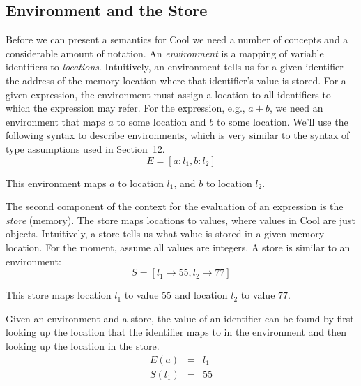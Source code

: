 \documentclass[]{article}
\begin{document}
\subsection{Environment and the Store}

Before we can present a semantics for Cool we need a number of concepts
and a considerable amount of notation. An \emph{environment} is a
mapping of variable identifiers to \emph{locations}. Intuitively, an
environment tells us for a given identifier the address of the memory
location where that identifier's value is stored. For a given
expression, the environment must assign a location to all identifiers to
which the expression may refer. For the expression, e.g., $a + b$, we
need an environment that maps $a$ to some location and $b$ to some
location. We'll use the following syntax to describe environments, which
is very similar to the syntax of type assumptions used in
Section~\href{node41.html\#sec-typrules}{12}. \\

\begin{displaymath}
E = [ a:l_1, b:l_2]
\end{displaymath}

This environment maps $a$ to location $l_1$, and $b$ to location $l_2$.

The second component of the context for the evaluation of an expression
is the \emph{store} (memory). The store maps locations to values, where
values in Cool are just objects. Intuitively, a store tells us what
value is stored in a given memory location. For the moment, assume all
values are integers. A store is similar to an environment: \\

\begin{displaymath}
S = [ l_1\rightarrow 55, l_2\rightarrow 77 ]
\end{displaymath}

This store maps location $l_1$ to value $55$ and location $l_2$ to value
$77$.

Given an environment and a store, the value of an identifier can be
found by first looking up the location that the identifier maps to in
the environment and then looking up the location in the store. \\

\begin{displaymath}
\begin{array}{rcl}
E(a) &=& l_1 \\
S(l_1) & = & 55
\end{array}\end{displaymath}
\end{document}
